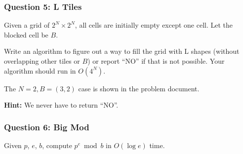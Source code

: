 \documentclass{beamer}
\begin{document}
\begin{frame}
\end{frame}

\begin{frame}
\end{frame}

\begin{frame}
\frametitle{Question 5: L Tiles}

Given a grid of $2^N \times 2^N$, all cells are initially empty except one cell. Let the blocked cell be $B$.

\vspace{0.3cm}

Write an algorithm to figure out a way to fill the grid with L shapes (without overlapping other tiles or $B$) or report ``NO'' if that is not possible. Your algorithm should run in $O(4^N)$.

\vspace{0.3cm}

The $N = 2, B = (3,2)$ case is shown in the problem document.

\vspace{0.3cm}

\textbf{Hint:} We never have to return ``NO''.

\end{frame}

\begin{frame}
\end{frame}

\begin{frame}
\end{frame}

\begin{frame}[fragile]
\frametitle{Question 6: Big Mod}

Given $p$, $e$, $b$, compute $p^e \bmod b$ in $O(\log e)$ time.

\end{frame}

\begin{frame}
\end{frame}

\begin{frame}
\end{frame}
\end{document}
